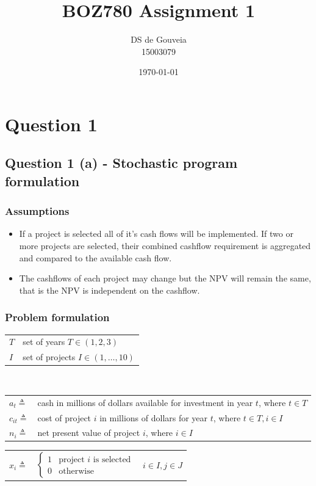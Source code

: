 \documentclass[a4paper,11pt]{article}
\title{BOZ780 Assignment 1}
\author{DS de Gouveia \\ 15003079}
\date{\today}
\begin{document}
\maketitle
\tableofcontents
\newpage

\section{Question 1}\label{q1}
\subsection{Question 1 (a) - Stochastic program formulation}

\subsubsection{Assumptions}
\begin{itemize}
	\item If a project is selected all of it's cash flows will be implemented. If two or more projects are selected, their combined cashflow requirement is aggregated and compared to the available cash flow.
	\item The cashflows of each project may change but the NPV will remain the same, that is the NPV is independent on the cashflow. 
\end{itemize}


\subsubsection{Problem formulation}

\begin{tabular}{ll}
$T$ & set of years $T \in (1,2,3)$ \\
$I$ & set of projects $I \in (1,\dots, 10)$ 
\end{tabular}\\

\begin{tabular}{ll}
$a_{t} \triangleq$ & cash in millions of dollars available for investment in year $t$, where  $t \in T$\\
$c_{it} \triangleq$ & cost of project $i$ in millions of dollars for year $t$, where $t \in T, i \in I$\\
$n_{i} \triangleq$ & net present value of project $i$, where  $i \in I$\\
\end{tabular}


\begin{tabular}{lll}
$x_{i} \triangleq$ & 
	$\begin{cases} 
      	1 & \text{project $i$ is selected} \\
      	0 & \text{otherwise} 
	\end{cases}$ & $i \in I, j \in J$
\end{tabular}\\
\end{document}
